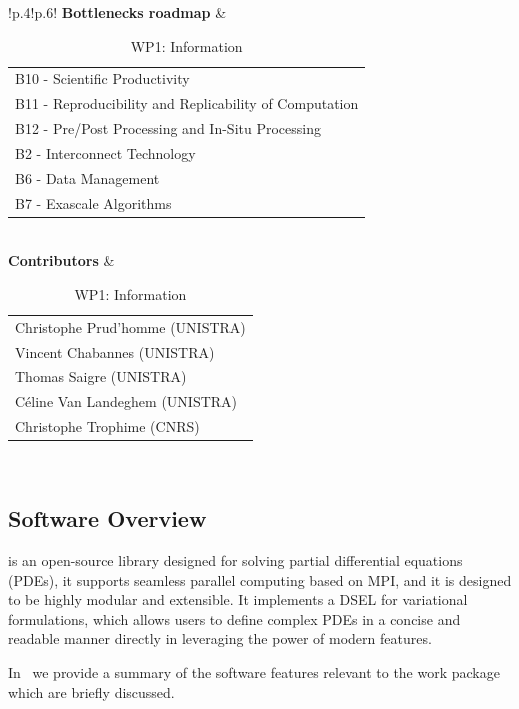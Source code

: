 \begin{table}[!ht]
{{\begin{tabular}{!{\color{numpexgray}\vrule}p{.4\textwidth}!{\color{numpexgray}\vrule}p{.6\textwidth}!{\color{numpexgray}\vrule}}
        \textbf{Bottlenecks roadmap} & \begin{tabular}{l}
B10 - Scientific Productivity\\
B11 - Reproducibility and Replicability of Computation\\
B12 - Pre/Post Processing and In-Situ Processing\\
B2 - Interconnect Technology\\
B6 - Data Management\\
B7 - Exascale Algorithms\\
\end{tabular} \\
\textbf{Contributors} & \begin{tabular}{l}
    Christophe Prud'homme (UNISTRA)\\
    Vincent Chabannes (UNISTRA)\\
    Thomas Saigre (UNISTRA)\\
    Céline Van Landeghem (UNISTRA)\\
    Christophe Trophime (CNRS)\\
\end{tabular}\\
        \hline
    \end{tabular}
    }}
    \caption{WP1: \Feelpp{} Information}
\end{table}

\subsection{Software Overview}
\label{sec:WP1:Feelpp:summary}

\Feelpp is an open-source \Cpp{} library designed for solving partial differential equations (PDEs), it supports seamless parallel computing based on MPI, and it is designed to be highly modular and extensible.
It implements a \ac{DSEL} for variational formulations, which allows users to define complex PDEs in a concise and readable manner directly in \Cpp{} leveraging the power of modern \Cpp{} features.

In~ we provide a summary of the software features relevant to the work package which are briefly discussed.

